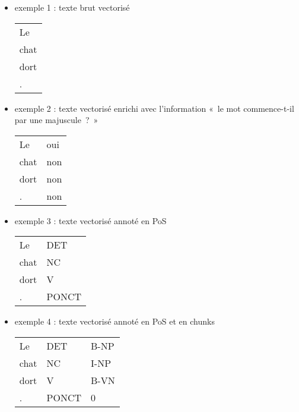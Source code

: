 \documentclass[manual-fr.tex]{subfiles}
\begin{document}
\begin{itemize}
	\item[] exemple 1 : texte brut vectorisé\\
	\begin{tabular}{l}Le \\ chat \\ dort \\ .\end{tabular}
	\item[] exemple 2 : texte vectorisé enrichi avec l'information «\ le mot commence-t-il par une majuscule\ ?\ »\\
	\begin{tabular}{ll}Le & oui \\ chat & non \\ dort & non \\ . & non\end{tabular}
	\item[] exemple 3 : texte vectorisé annoté en PoS\\
	\begin{tabular}{ll}Le & DET \\ chat & NC \\ dort & V \\ . & PONCT\end{tabular}
	\item[] exemple 4 : texte vectorisé annoté en PoS et en chunks\\
	\begin{tabular}{lll}Le & DET & B-NP\\ chat & NC & I-NP\\ dort & V & B-VN\\ . & PONCT & 0\end{tabular}
\end{itemize}
\end{document}
